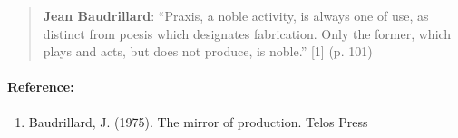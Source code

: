 \begin{quote}
\textbf{Jean Baudrillard}: ``Praxis, a noble activity, is always one of
use, as distinct from poesis which designates fabrication. Only the
former, which plays and acts, but does not produce, is noble.'' {[}1{]}
(p. 101)
\end{quote}

\paragraph{Reference:}

\begin{enumerate}
\itemsep1pt\parskip0pt
\item
  Baudrillard, J. (1975). The mirror of production. Telos Press
\end{enumerate}
